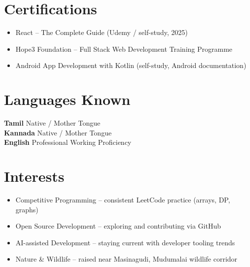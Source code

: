\documentclass[a4paper,10.5pt]{article}
\newcommand{\resumeItem}[1]{
  \item\small{#1 \vspace{-1pt}}
}
\newcommand{\resumeItemListStart}{\begin{itemize}[leftmargin=0.2in]\vspace{-2pt}}
\newcommand{\resumeItemListEnd}{\end{itemize}\vspace{-3pt}}
\begin{document}
\vspace{4pt}

\section{Certifications}
  \resumeItemListStart
    \resumeItem{React -- The Complete Guide (Udemy / self-study, 2025)}
    \resumeItem{Hope3 Foundation -- Full Stack Web Development Training Programme}
    \resumeItem{Android App Development with Kotlin (self-study, Android documentation)}
  \resumeItemListEnd

\vspace{4pt}

\section{Languages Known}
\vspace{3pt}
\begin{itemize}[leftmargin=0.15in, label={}]
  \small{\item{
    \textbf{Tamil} \hfill Native / Mother Tongue \\[3pt]
    \textbf{Kannada} \hfill Native / Mother Tongue \\[3pt]
    \textbf{English} \hfill Professional Working Proficiency \\
  }}
\end{itemize}

\vspace{4pt}

\section{Interests}
\vspace{3pt}
\begin{itemize}[leftmargin=0.2in]\vspace{-1pt}
  \resumeItem{Competitive Programming -- consistent LeetCode practice (arrays, DP, graphs)}
  \resumeItem{Open Source Development -- exploring and contributing via GitHub}
  \resumeItem{AI-assisted Development -- staying current with developer tooling trends}
  \resumeItem{Nature \& Wildlife -- raised near Masinagudi, Mudumalai wildlife corridor}
\end{itemize}

\vspace{6pt}

\end{document}
